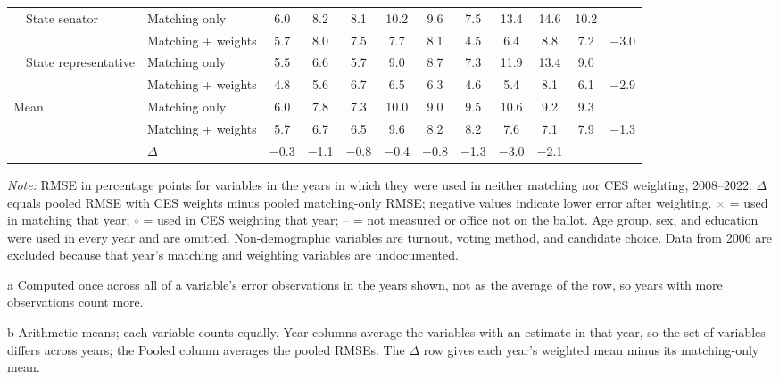 \begin{table}[!htbp]
{\begin{threeparttable}
\begin{tabular}{llcccccccccc}
\addlinespace[0.1em]
~~State senator & Matching only & 6.0 & 8.2 & 8.1 & 10.2 & 9.6 & 7.5 & 13.4 & 14.6 & 10.2 & \\
 & Matching + weights & 5.7 & 8.0 & 7.5 & 7.7 & 8.1 & 4.5 & 6.4 & 8.8 & 7.2 & $-$3.0 \\
\addlinespace[0.1em]
~~State representative & Matching only & 5.5 & 6.6 & 5.7 & 9.0 & 8.7 & 7.3 & 11.9 & 13.4 & 9.0 & \\
 & Matching + weights & 4.8 & 5.6 & 6.7 & 6.5 & 6.3 & 4.6 & 5.4 & 8.1 & 6.1 & $-$2.9 \\
\midrule
Mean\tnote{b} & Matching only & 6.0 & 7.8 & 7.3 & 10.0 & 9.0 & 9.5 & 10.6 & 9.2 & 9.3 & \\
 & Matching + weights & 5.7 & 6.7 & 6.5 & 9.6 & 8.2 & 8.2 & 7.6 & 7.1 & 7.9 & $-$1.3 \\
 & $\Delta$ & $-$0.3 & $-$1.1 & $-$0.8 & $-$0.4 & $-$0.8 & $-$1.3 & $-$3.0 & $-$2.1 & & \\
\bottomrule
\end{tabular}
\begin{tablenotes}
\footnotesize
\item \textit{Note:} RMSE in percentage points for variables in the years in which they were used in neither matching nor CES weighting, 2008--2022. $\Delta$ equals pooled RMSE with CES weights minus pooled matching-only RMSE; negative values indicate lower error after weighting. \textcolor{gray}{$\times$} = used in matching that year; \textcolor{gray}{$\circ$} = used in CES weighting that year; \textcolor{gray}{--} = not measured or office not on the ballot. Age group, sex, and education were used in every year and are omitted. Non-demographic variables are turnout, voting method, and candidate choice. Data from 2006 are excluded because that year's matching and weighting variables are undocumented.
\item[a] Computed once across all of a variable's error observations in the years shown, not as the average of the row, so years with more observations count more.
\item[b] Arithmetic means; each variable counts equally. Year columns average the variables with an estimate in that year, so the set of variables differs across years; the Pooled column averages the pooled RMSEs. The $\Delta$ row gives each year's weighted mean minus its matching-only mean.
\end{tablenotes}
\end{threeparttable}%
}
\end{table}